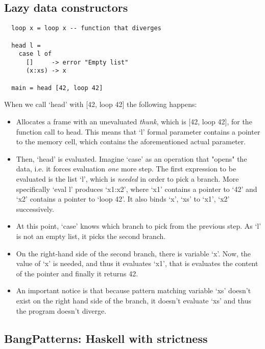 \documentclass[diploma]{softlab-thesis}
\begin{document}
\subsection{Lazy data constructors}
\label{sec:lazy-data-cons}

\begin{verbatim}
  loop x = loop x -- function that diverges

  head l = 
    case l of 
      []     -> error "Empty list"
      (x:xs) -> x

  main = head [42, loop 42]
\end{verbatim}

When we call `head' with [42, loop 42] the following happens:
\begin {itemize}
  \item Allocates a frame with an unevaluated \textit{thunk}, which is [42, loop 42], for the function call to head.
  This means that `l' formal parameter contains a pointer to the memory cell, which contains the aforementioned actual parameter. 
  \item Then, `head' is evaluated. Imagine `case' as an operation that "opens" the data, i.e. it forces evaluation \textit{one} 
  more step. The first expression to be evaluated is the list `l', which is \textit{needed} in order to pick a branch. More 
  specifically `eval l' produces `x1:x2', where `x1' contains a pointer to `42' and `x2' contains a pointer to `loop 42'.
  It also binds `x', `xs' to `x1', `x2' successively.
  \item At this point, `case' knows which branch to pick from the previous step. As `l' is not an empty list, it picks the 
  second branch. 
  \item On the right-hand side of the second branch, there is variable `x'. Now, the value of `x' is needed, and thus 
  it evaluates `x1', that is evaluates the content of the pointer and finally it returns 42.
  \item An important notice is that because pattern matching variable `xs' doesn't exist on the right hand side 
  of the branch, it doesn't evaluate `xs' and thus the program doesn't diverge.
\end{itemize}

\subsection{BangPatterns: Haskell with strictness}
\label{sec:bangpatterns}
\end{document}
